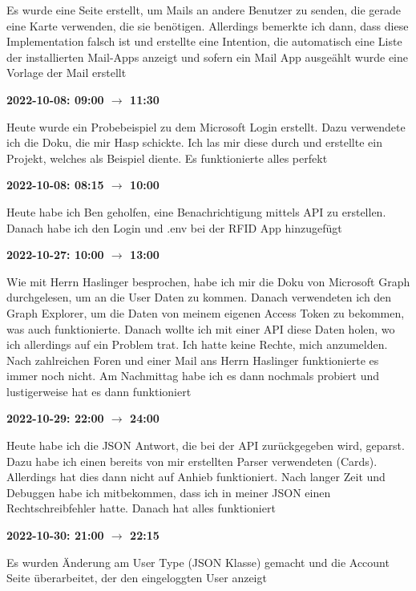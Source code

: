 Es wurde eine Seite erstellt, um Mails an andere Benutzer zu senden, die gerade eine Karte verwenden, die sie benötigen. Allerdings bemerkte ich dann, dass diese Implementation falsch ist und erstellte eine Intention, die automatisch eine Liste der
installierten Mail-Apps anzeigt und sofern ein Mail App ausge\"ahlt wurde eine Vorlage der Mail erstellt

\textbf{2022-10-08: 09:00 $\rightarrow$ 11:30}

Heute wurde ein Probebeispiel zu dem Microsoft Login erstellt. Dazu verwendete ich die Doku, die mir Hasp schickte. Ich las mir diese durch und erstellte ein Projekt,
welches als Beispiel diente. Es funktionierte alles perfekt

\vspace{0.5cm} \textbf{2022-10-08: 08:15 $\rightarrow$ 10:00} 

Heute habe ich Ben geholfen, eine Benachrichtigung mittels API zu erstellen. Danach habe
ich den Login und .env bei der RFID App hinzugefügt

\vspace{0.5cm} \textbf{2022-10-27: 10:00 $\rightarrow$ 13:00} 

Wie mit Herrn Haslinger besprochen, habe ich mir die Doku von Microsoft Graph durchgelesen, um an die User Daten zu kommen. Danach verwendeten ich den Graph Explorer, um
die Daten von meinem eigenen Access Token zu bekommen, was auch
funktionierte. Danach wollte ich mit einer API diese Daten holen, wo ich
allerdings auf ein Problem trat. Ich hatte keine Rechte, mich anzumelden.
Nach zahlreichen Foren und einer Mail ans Herrn Haslinger funktionierte
es immer noch nicht. Am Nachmittag habe ich es dann nochmals
probiert und lustigerweise hat es dann funktioniert

\vspace{0.5cm} \textbf{2022-10-29: 22:00 $\rightarrow$ 24:00} 

Heute habe ich die JSON Antwort, die bei der API zurückgegeben wird, geparst. Dazu habe ich einen bereits von mir erstellten Parser verwendeten (Cards). Allerdings
hat dies dann nicht auf Anhieb funktioniert. Nach langer Zeit und
Debuggen habe ich mitbekommen, dass ich in meiner JSON einen
Rechtschreibfehler hatte. Danach hat alles funktioniert

\vspace{0.5cm} \textbf{2022-10-30: 21:00 $\rightarrow$ 22:15} 

Es wurden Änderung am User Type (JSON Klasse) gemacht und die Account Seite überarbeitet, der den eingeloggten User anzeigt

